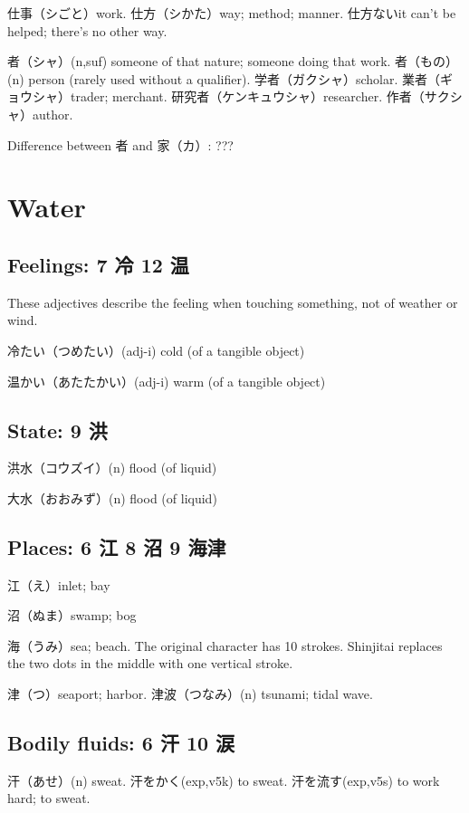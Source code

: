 仕事（シごと）work.
仕方（シかた）way; method; manner.
仕方ないit can't be helped; there's no other way.

者（シャ）(n,suf) someone of that nature; someone doing that work.
者（もの）(n) person (rarely used without a qualifier).
学者（ガクシャ）scholar.
業者（ギョウシャ）trader; merchant.
研究者（ケンキュウシャ）researcher.
作者（サクシャ）author.

Difference between 者 and 家（カ）: ???

\section{Water}

\subsection{Feelings: 7 冷 12 温}

These adjectives describe the feeling when
touching something, not of weather or wind.

冷たい（つめたい）(adj-i) cold (of a tangible object)

温かい（あたたかい）(adj-i) warm (of a tangible object)

\subsection{State: 9 洪}

洪水（コウズイ）(n) flood (of liquid)

大水（おおみず）(n) flood (of liquid)

\subsection{Places: 6 江 8 沼 9 海津}

江（え）inlet; bay

沼（ぬま）swamp; bog

海（うみ）sea; beach.
The original character has 10 strokes.
Shinjitai replaces the two dots in the middle
with one vertical stroke.

津（つ）seaport; harbor.
津波（つなみ）(n) tsunami; tidal wave.

\subsection{Bodily fluids: 6 汗 10 涙}

汗（あせ）(n) sweat.
汗をかく(exp,v5k) to sweat.
汗を流す(exp,v5s) to work hard; to sweat.

